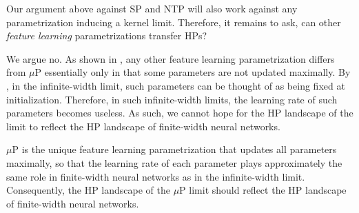 \documentclass{article}
\theoremstyle{definition}
\begin{document}
    Our argument above against SP and NTP will also work against any parametrization inducing a kernel limit.
    Therefore, it remains to ask, can other \emph{feature learning} parametrizations transfer HPs?
    
    We argue no. As shown in \cite{TP4}, any other feature learning parametrization differs from $\mu$P essentially only in that some parameters are not updated maximally.
    By \citep[Sec 6.4]{TP4}, in the infinite-width limit, such parameters can be thought of as being fixed at initialization. Therefore, in such infinite-width limits, the learning rate of such parameters becomes useless.
    As such, we cannot hope for the HP landscape of the limit to reflect the HP landscape of finite-width neural networks.
    
    $\mu$P is the unique feature learning parametrization that updates all parameters maximally, so that the learning rate of each parameter plays approximately the same role in finite-width neural networks as in the infinite-width limit. Consequently, the HP landscape of the $\mu$P limit should reflect the HP landscape of finite-width neural networks.
    
\end{document}
